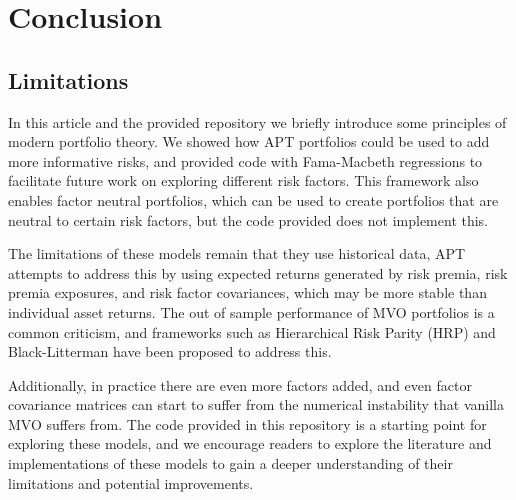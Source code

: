 \section{Conclusion}
\label{sec:conclusion}
\subsection{Limitations}
In this article and the provided repository we briefly introduce some principles of modern portfolio theory.
We showed how APT portfolios could be used to add more informative risks, and provided code with Fama-Macbeth regressions to facilitate 
future work on exploring different risk factors. This framework also enables factor neutral portfolios, which can be used to create portfolios that are neutral to certain risk factors, but
the code provided does not implement this.

The limitations of these models remain that they use historical data, APT attempts to address this by using expected returns generated by 
risk premia, risk premia exposures, and risk factor covariances, which may be more stable than individual asset returns. The out of sample performance
of MVO portfolios is a common criticism, and frameworks such as Hierarchical Risk Parity (HRP) and Black-Litterman have been proposed to address this.

Additionally, in practice there are even more factors added, and even factor covariance matrices can start to suffer from the numerical instability that vanilla MVO suffers from.
The code provided in this repository is a starting point for exploring these models, and we encourage readers to explore the literature and
implementations of these models to gain a deeper understanding of their limitations and potential improvements.
